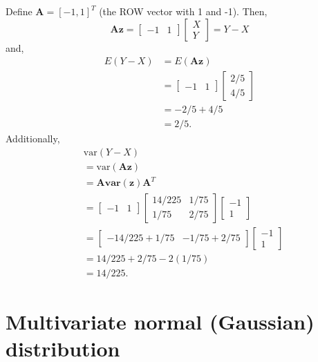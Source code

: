 \documentclass[
]{book}
\theoremstyle{definition}
\theoremstyle{definition}
\theoremstyle{definition}
\theoremstyle{definition}
\theoremstyle{remark}
\begin{document}
Define \(\mathbf{A}=[-1, 1]^T\) (the ROW vector with 1 and -1). Then,
\[
\mathbf{Az}=\begin{bmatrix}-1 & 1\end{bmatrix}
\begin{bmatrix}
X\\
Y
\end{bmatrix}
=Y-X
\]
and,
\[
\begin{aligned}
E(Y-X)&=E(\mathbf{Az})\\
&=\begin{bmatrix}-1 & 1\end{bmatrix}
\begin{bmatrix}
2/5\\
4/5
\end{bmatrix}\\
&=-2/5+4/5\\&=2/5.
\end{aligned}
\]
Additionally,
\[
\begin{aligned}
& \mathrm{var}(Y-X) \\
&=\mathrm{var}(\mathbf{Az}) \\
&=\mathbf{A}\mathbf{var}(\mathbf{z})\mathbf{A}^T \\
&=
\begin{bmatrix}
-1 & 1
\end{bmatrix}
\begin{bmatrix}
14/225 & 1/75 \\
1/75 & 2/75
\end{bmatrix}
\begin{bmatrix}
-1 \\ 1
\end{bmatrix} \\
&= \begin{bmatrix}
-14/225+1/75 & -1/75+2/75
\end{bmatrix}
\begin{bmatrix}
-1 \\ 1
\end{bmatrix} \\
&= 14/225 + 2/75 - 2(1/75) \\
&=14/225.
\end{aligned}
\]

\hypertarget{multivariate-normal-gaussian-distribution}{%
\section{Multivariate normal (Gaussian) distribution}\label{multivariate-normal-gaussian-distribution}}
\end{document}
